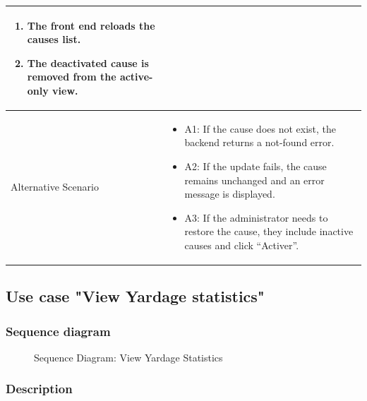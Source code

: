 {\begin{longtable}{|p{}|p{}|}
\begin{enumerate}
\item The front end reloads the causes list.
\item The deactivated cause is removed from the active-only view.
\end{enumerate} \\ \hline
Alternative Scenario &
\begin{itemize}
\item A1: If the cause does not exist, the backend returns a not-found error.
\item A2: If the update fails, the cause remains unchanged and an error message is displayed.
\item A3: If the administrator needs to restore the cause, they include inactive causes and click ``Activer''.
\end{itemize} \\ \hline
\end{longtable}
}

\subsection{Use case "View Yardage statistics"}

\subsubsection{Sequence diagram}

\begin{figure}[H]
\centering
{}
\caption{Sequence Diagram: View Yardage Statistics}
\label{fig:chapter2-view-yardage-statistics}
\end{figure}

\subsubsection{Description}

